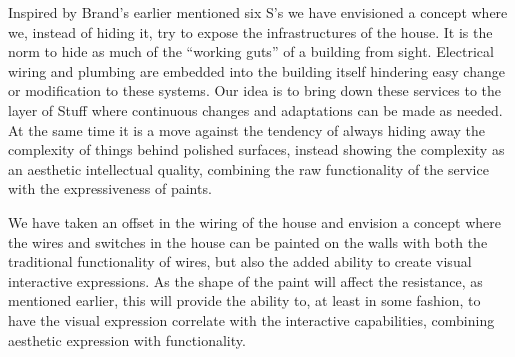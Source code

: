 Inspired by Brand's earlier mentioned six S's \citep{brand1995buildings} we have envisioned a concept where we, instead of hiding it, try to expose the infrastructures of the house.
It is the norm to hide as much of the ``working guts'' of a building from sight.
Electrical wiring and plumbing are embedded into the building itself hindering easy change or modification to these systems.
Our idea is to bring down these services to the layer of Stuff where continuous changes and adaptations can be made as needed.
At the same time it is a move against the tendency of always hiding away the complexity of things behind polished surfaces, instead showing the complexity as an aesthetic intellectual quality, combining the raw functionality of the service with the expressiveness of paints.

We have taken an offset in the wiring of the house and envision a concept where the wires and switches in the house can be painted on the walls with both the traditional functionality of wires, but also the added ability to create visual interactive expressions.
As the shape of the paint will affect the resistance, as mentioned earlier, this will provide the ability to, at least in some fashion, to have the visual expression correlate with the interactive capabilities, combining aesthetic expression with functionality.

